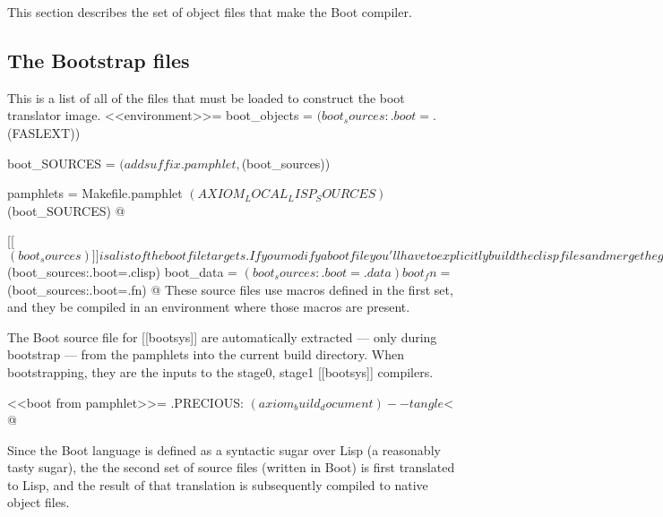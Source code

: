 \documentclass{article}
\begin{document}
This section describes the set of object files that make the Boot compiler.

\subsection{The Bootstrap files}
\label{sec:boot-compiler:bootstrap}

This is a list of all of the files that must be loaded to construct the
boot translator image.
<<environment>>=
boot_objects = $(boot_sources:.boot=.$(FASLEXT))

boot_SOURCES = $(addsuffix .pamphlet, $(boot_sources))

pamphlets = Makefile.pamphlet $(AXIOM_LOCAL_LISP_SOURCES) $(boot_SOURCES)
@

[[$(boot_sources)]] is a list of the boot file targets. If you modify a
boot file you'll have to explicitly build the clisp files and
merge the generated code back into the pamphlet by hand. The
assumption is that if you know enough to change the fundamental
bootstrap files you know how to migrate the changes back.
This process, by design, does not occur automatically (though it
could).

The Boot compiler, [[bootsys]], is built from a set of source files
written in Boot.  Note that the order is
important as earlier files will contain code needed by later files.
<<environment>>=
boot_sources = ptyout.boot btincl2.boot \
	btscan2.boot typrops.boot btpile2.boot \
	typars.boot tytree1.boot

boot_clisp = $(boot_sources:.boot=.clisp)
boot_data = $(boot_sources:.boot=.data)
boot_fn = $(boot_sources:.boot=.fn)
@
These source files use macros defined in the first set, and they be compiled
in an environment where those macros are present.



The Boot source file for [[bootsys]] are automatically extracted ---
only during bootstrap --- from the pamphlets into the current build
directory.  When bootstrapping, they are the inputs to the stage0, stage1
 [[bootsys]] compilers.

<<boot from pamphlet>>=
.PRECIOUS: %
	$(axiom_build_document) --tangle $<
@

Since the Boot language is defined as a syntactic sugar over Lisp
(a reasonably tasty sugar), the
the second set of source files (written in Boot) is first translated
to Lisp, and the result of that translation is subsequently compiled to
native object files.
\end{document}
